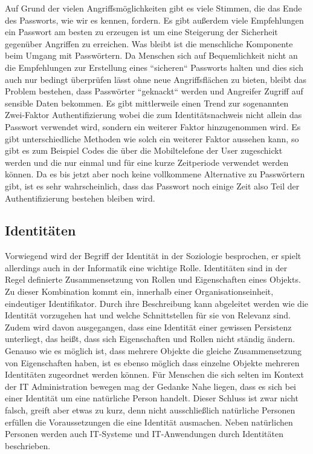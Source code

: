 \documentclass[
book,
a4paper,   
titlepage,  
halfparskip,
12pt        
]{scrartcl}
\begin{document}
\begin{onehalfspacing}
Auf Grund der vielen Angriffsmöglichkeiten gibt es viele Stimmen, die das Ende des Passworts, wie wir es kennen, fordern. Es gibt außerdem viele Empfehlungen ein Passwort am besten zu erzeugen ist um eine Steigerung der Sicherheit gegenüber Angriffen zu erreichen. Was bleibt ist die menschliche Komponente beim Umgang mit Passwörtern. Da Menschen sich auf Bequemlichkeit nicht an die Empfehlungen zur Erstellung eines ``sicheren`` Passworts halten und dies sich auch nur bedingt überprüfen lässt ohne neue Angriffsflächen zu bieten, bleibt das Problem bestehen, dass Passwörter ``geknackt`` werden und Angreifer Zugriff auf sensible Daten bekommen. Es gibt mittlerweile einen Trend zur sogenannten Zwei-Faktor Authentifizierung wobei die zum Identitätsnachweis nicht allein das Passwort verwendet wird, sondern ein weiterer Faktor hinzugenommen wird. Es gibt unterschiedliche Methoden wie solch ein weiterer Faktor aussehen kann, so gibt es zum Beispiel Codes die über die Mobiltelefone der User zugeschickt werden und die nur einmal und für eine kurze Zeitperiode verwendet werden können. Da es bis jetzt aber noch keine vollkommene Alternative zu Passwörtern gibt, ist es sehr wahrscheinlich, dass das Passwort noch einige Zeit also Teil der Authentifizierung bestehen bleiben wird.\cite{pass}

\subsection{Identitäten}
\label{subsec:ident}
Vorwiegend wird der Begriff der Identität in der Soziologie besprochen, er spielt allerdings auch in der Informatik eine wichtige Rolle. Identitäten sind in der Regel definierte Zusammensetzung von Rollen und Eigenschaften eines Objekts. Zu dieser Kombination kommt ein, innerhalb einer Organisationseinheit, eindeutiger Identifikator. Durch ihre Beschreibung kann abgeleitet werden wie die Identität vorzugehen hat und welche Schnittstellen für sie von Relevanz sind. Zudem wird davon ausgegangen, dass eine Identität einer gewissen Persistenz unterliegt, das heißt, dass sich Eigenschaften und Rollen nicht ständig ändern. Genauso wie es möglich ist, dass mehrere Objekte die gleiche Zusammensetzung von Eigenschaften haben, ist es ebenso möglich dass einzelne Objekte mehreren Identitäten zugeordnet werden können. Für Menschen die sich selten im Kontext der \ac{IT} Administration bewegen mag der Gedanke Nahe liegen, dass es sich bei einer Identität um eine natürliche Person handelt. Dieser Schluss ist zwar nicht falsch, greift aber etwas zu kurz, denn nicht ausschließlich natürliche Personen erfüllen die Voraussetzungen die eine Identität ausmachen. Neben natürlichen Personen werden auch \ac{IT}-Systeme und \ac{IT}-Anwendungen durch Identitäten beschrieben. \cite[S. 21ff]{kerberos2}


\end{onehalfspacing}
\end{document}
